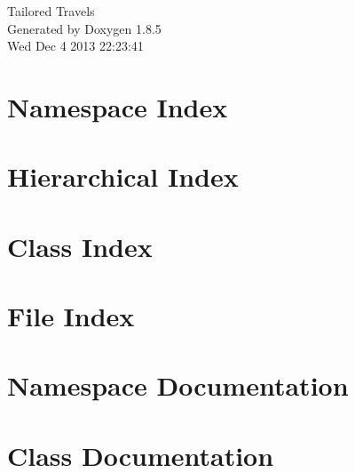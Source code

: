 \documentclass[twoside]{book}
\newcommand{\clearemptydoublepage}{%
  \newpage{\pagestyle{empty}\cleardoublepage}%
}
\begin{document}
\hypersetup{pageanchor=false}
\begin{titlepage}
\vspace*{7cm}
\begin{center}%
{\Large Tailored Travels }\\
\vspace*{1cm}
{\large Generated by Doxygen 1.8.5}\\
\vspace*{0.5cm}
{\small Wed Dec 4 2013 22:23:41}\\
\end{center}
\end{titlepage}
\clearemptydoublepage
\tableofcontents
\clearemptydoublepage
{}
\hypersetup{pageanchor=true}

\chapter{Namespace Index}

\chapter{Hierarchical Index}

\chapter{Class Index}

\chapter{File Index}

\chapter{Namespace Documentation}




\chapter{Class Documentation}










\end{document}
